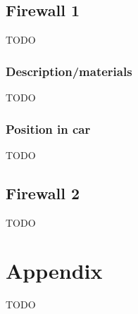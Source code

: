 \documentclass{article}
\begin{document}
\subsection{Firewall 1}
TODO

\subsubsection{Description/materials}
TODO

\subsubsection{Position in car}
TODO

\subsection{Firewall 2}
TODO

\section{Appendix}
TODO
\end{document}

